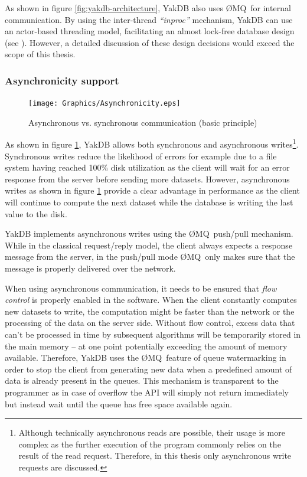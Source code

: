 \documentclass[a4paper, 12pt, twoside, reqn]{report}
\numberwithin{figure}{chapter}
\newtheorem[L]{boxedDefinition}{Definition}
\newtheorem[L]{boxedExample}{Example}
\newcommand{\ZMQ}{{\O}MQ}
\newcommand{\itquote}[1]{\textit{{``}#1{''}}}
\begin{document}
As shown in figure \ref{fig:yakdb-architecture}, YakDB also uses \ZMQ\ for internal communication. By using the inter-thread \itquote{inproc} mechanism, YakDB can use an actor-based threading model, facilitating an almost lock-free database design (see \cite{hintjens2013zeromq}). However, a detailed discussion of these design decisions would exceed the scope of this thesis.
 
\subsubsection{Asynchronicity support}\label{ssec:asynchronicity}

\begin{figure}[!htb]
  \centering
  \texttt{[image: Graphics/Asynchronicity.eps]}
  \caption[Asynchronous vs. synchronous communication schematic]{Asynchronous vs. synchronous communication (basic principle)}
  \label{fig:asynchronicity}
\end{figure}

As shown in figure \ref{fig:asynchronicity}, YakDB allows both synchronous and asynchronous writes\footnote{Although technically asynchronous reads are possible, their usage is more complex as the further execution of the program commonly relies on the result of the read request. Therefore, in this thesis only asynchronous write requests are discussed.}. Synchronous writes reduce the likelihood of errors for example due to a file system having reached 100\% disk utilization as the client will wait for an error response from the server before sending more datasets. However, asynchronous writes as shown in figure \ref{fig:asynchronicity} provide a clear advantage in performance as the client will continue to compute the next dataset while the database is writing the last value to the disk.

YakDB implements asynchronous writes using the \ZMQ\ push/pull mechanism. While in the classical request/reply model, the client always expects a response message from the server, in the push/pull mode \ZMQ\ only makes sure that the message is properly delivered over the network.

When using asynchronous communication, it needs to be ensured that \textit{flow control} is properly enabled in the software. When the client constantly computes new datasets to write, the computation might be faster than the network or the processing of the data on the server side. Without flow control, excess data that can't be processed in time by subsequent algorithms will be temporarily stored in the main memory -- at one point potentially exceeding the amount of memory available. Therefore, YakDB uses the \ZMQ\ feature of queue watermarking in order to stop the client from generating new data when a predefined amount of data is already present in the queues. This mechanism is transparent to the programmer as in case of overflow the API will simply not return immediately but instead wait until the queue has free space available again.
\end{document}
